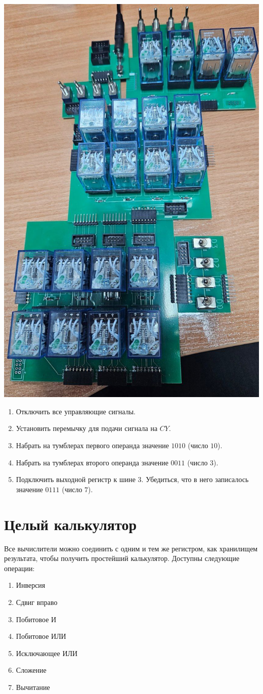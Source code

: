 \documentclass{book}
\begin{document}
\includegraphics[width=0.5\columnwidth]{photo/subtractor.jpg}

\begin{enumerate}
    \item Отключить все управляющие сигналы.
    \item Установить перемычку для подачи сигнала на $CY$.
    \item Набрать на тумблерах первого операнда значение $1010$ (число $10$).
    \item Набрать на тумблерах второго операнда значение $0011$ (число $3$).
    \item Подключить выходной регистр к шине $3$. Убедиться, что в него записалось значение $0111$ (число $7$).
\end{enumerate}


\section{Целый калькулятор}

Все вычислители можно соединить с одним и тем же регистром, как хранилищем результата, чтобы получить простейший
калькулятор. Доступны следующие операции:
\begin{enumerate}
    \item Инверсия
    \item Сдвиг вправо
    \item Побитовое И
    \item Побитовое ИЛИ
    \item Исключающее ИЛИ
    \item Сложение
    \item Вычитание
\end{enumerate}
\end{document}
